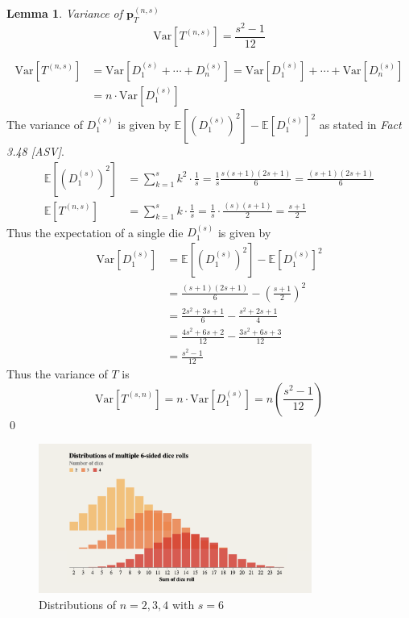 \documentclass[a4paper]{article}
\newtheorem{lemma}{Lemma}
\renewenvironment{proof}{{\bfseries Proof}}{\qed}
\begin{document}
\begin{lemma}{Variance of $\textbf{p}_{T}^{(n, s)}$}
    $$ \text{Var}[T^{(n, s)}] = \frac{s^2 - 1}{12}  $$
\end{lemma}
%
\begin{proof}
    \begin{align*}
        \text{Var}[T^{(n, s)}] &= \text{Var}[D_{1}^{(s)} + \cdots + D_{n}^{(s)}] = \text{Var}[D_{1}^{(s)}] + \cdots + \text{Var}[D_{n}^{(s)}] \\
        &= n \cdot \text{Var}[D_{1}^{(s)}] 
    \end{align*}
    The variance of $D_{1}^{(s)}$ is given by $\mathbb{E}\left[(D_{1}^{(s)})^2 \right] - \mathbb{E}\left[D_{1}^{(s)} \right]^2$ as stated in \textit{Fact 3.48 [ASV]}.
    \begin{align*}
        \mathbb{E}\left[\left(D_{1}^{(s)}\right)^2 \right] &= \sum_{k=1}^{s} k^2 \cdot \frac{1}{s} = \frac{1}{s} \frac{s(s+1)(2s+1)}{6} = \frac{(s+1)(2s+1)}{6} \\
        \mathbb{E}[T^{(n, s)}] &= \sum_{k=1}^{s} k \cdot \frac{1}{s} = \frac{1}{s} \cdot \frac{(s)(s+1)}{2} = \frac{s+1}{2}
    \end{align*}
    Thus the expectation of a single die $D_{1}^{(s)}$ is given by 
    \begin{align*}
    \text{Var}[D_{1}^{(s)}] &= \mathbb{E}\left[(D_{1}^{(s)})^2 \right] - \mathbb{E}\left[D_{1}^{(s)} \right]^2 \\
    &= \frac{(s+1)(2s+1)}{6} - \left(\frac{s+1}{2} \right)^2 \\
    &= \frac{2s^2 + 3s + 1}{6} - \frac{s^2 + 2s + 1}{4} \\
    &= \frac{4s^2 + 6s + 2}{12} - \frac{3s^2 + 6s + 3}{12} \\
    &= \frac{s^2 - 1}{12}
    \end{align*}
    Thus the variance of $T$ is
    $$
    \text{Var}[T^{(s, n)}] = n \cdot \text{Var}[D_{1}^{(s)}]  = n \left(\frac{s^2 - 1}{12} \right)
    $$
\end{proof}


\begin{figure}[h]
\centering
\includegraphics[width=0.8\textwidth]{Screenshot 2023-12-10 at 19.58.36.png}
\caption{Distributions of $n = 2, 3, 4$ with $s = 6$}
\end{figure}
\end{document}
